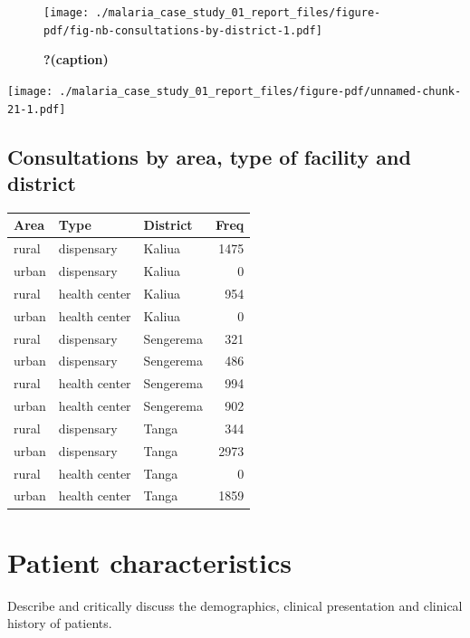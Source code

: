 \documentclass[
  letterpaper,
  DIV=11,
  numbers=noendperiod,
  oneside]{scrreprt}
\begin{document}
\begin{figure}

{\centering \texttt{[image: ./malaria\_case\_study\_01\_report\_files/figure-pdf/fig-nb-consultations-by-district-1.pdf]}

}

\caption{\label{fig-nb-consultations-by-district}\textbf{?(caption)}}

\end{figure}

\texttt{[image: ./malaria\_case\_study\_01\_report\_files/figure-pdf/unnamed-chunk-21-1.pdf]}

\hypertarget{consultations-by-area-type-of-facility-and-district}{%
\subsection{Consultations by area, type of facility and
district}\label{consultations-by-area-type-of-facility-and-district}}

\begin{longtable}[]{@{}lllr@{}}
\toprule()
Area & Type & District & Freq \\
\midrule()
\endhead
rural & dispensary & Kaliua & 1475 \\
urban & dispensary & Kaliua & 0 \\
rural & health center & Kaliua & 954 \\
urban & health center & Kaliua & 0 \\
rural & dispensary & Sengerema & 321 \\
urban & dispensary & Sengerema & 486 \\
rural & health center & Sengerema & 994 \\
urban & health center & Sengerema & 902 \\
rural & dispensary & Tanga & 344 \\
urban & dispensary & Tanga & 2973 \\
rural & health center & Tanga & 0 \\
urban & health center & Tanga & 1859 \\
\bottomrule()
\end{longtable}

\hypertarget{patient-characteristics}{%
\section{Patient characteristics}\label{patient-characteristics}}

Describe and critically discuss the demographics, clinical presentation
and clinical history of patients.
\end{document}
